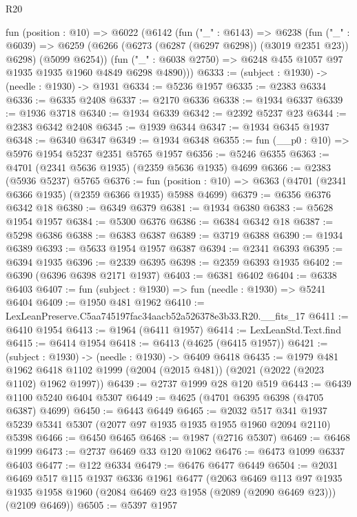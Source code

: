 \begin{lexlean}{R20}
\begin{coremodule}
  fun (position : @10) =>
  @6022
    (@6142
      (fun ("_" : @6143) =>
      @6238
        (fun ("_" : @6039) =>
        @6259 (@6266 (@6273 (@6287 (@6297 @6298)) (@3019 @2351 @23)) @6298) (@5099 @6254))
        (fun ("_" : @6038 @2750) => @6248 @455 @1057 @97 @1935 @1935 @1960 @4849 @6298 @4890)))
@6333 := (subject : @1930) -> (needle : @1930) -> @1931
@6334 := @5236 @1957
@6335 := @2383 @6334
@6336 := @6335 @2408
@6337 := @2170 @6336
@6338 := @1934 @6337
@6339 := @1936 @3718
@6340 := @1934 @6339
@6342 := @2392 @5237 @23
@6344 := @2383 @6342 @2408
@6345 := @1939 @6344
@6347 := @1934 @6345 @1937
@6348 := @6340 @6347
@6349 := @1934 @6348
@6355 := fun (__p0 : @10) => @5976 @1954 @5237 @2351 @5765 @1957
@6356 := @5246 @6355
@6363 := @4701 (@2341 @5636 @1935) (@2359 @5636 @1935) @4699
@6366 := @2383 (@5936 @5237) @5765
@6376 := fun (position : @10) => @6363 (@4701 (@2341 @6366 @1935) (@2359 @6366 @1935) @5988 @4699)
@6379 := @6356 @6376 @6342 @18
@6380 := @6349 @6379
@6381 := @1934 @6380
@6383 := @5628 @1954 @1957
@6384 := @5300 @6376
@6386 := @6384 @6342 @18
@6387 := @5298 @6386
@6388 := @6383 @6387
@6389 := @3719 @6388
@6390 := @1934 @6389
@6393 := @5633 @1954 @1957 @6387
@6394 := @2341 @6393
@6395 := @6394 @1935
@6396 := @2339 @6395
@6398 := @2359 @6393 @1935
@6402 := @6390 (@6396 @6398 @2171 @1937)
@6403 := @6381 @6402
@6404 := @6338 @6403
@6407 := fun (subject : @1930) => fun (needle : @1930) => @5241 @6404
@6409 := @1950 @481 @1962
@6410 := LexLeanPreserve.C5aa745197fac34aacb52a526378e3b33.R20.__fits_17
@6411 := @6410 @1954
@6413 := @1964 (@6411 @1957)
@6414 := LexLeanStd.Text.find
@6415 := @6414 @1954
@6418 := @6413 (@4625 (@6415 @1957))
@6421 := (subject : @1930) -> (needle : @1930) -> @6409 @6418
@6435 := @1979
    @481
    @1962
    @6418
    @1102
    @1999
    (@2004 (@2015 @481))
    (@2021 (@2022 (@2023 @1102) @1962 @1997))
@6439 := @2737 @1999 @28 @120 @519
@6443 := @6439 @1100 @5240 @6404 @5307
@6449 := @4625 (@4701 @6395 @6398 (@4705 @6387) @4699)
@6450 := @6443 @6449
@6465 := @2032
    @517
    @341
    @1937
    @5239
    @5341
    @5307
    (@2077 @97 @1935 @1935 @1955 @1960 @2094 @2110)
    @5398
@6466 := @6450 @6465
@6468 := @1987 (@2716 @5307)
@6469 := @6468 @1999
@6473 := @2737 @6469 @33 @120 @1062
@6476 := @6473 @1099 @6337 @6403
@6477 := @122 @6334
@6479 := @6476 @6477 @6449
@6504 := @2031
    @6469
    @517
    @115
    @1937
    @6336
    @1961
    @6477
    (@2063
      @6469
      @113
      @97
      @1935
      @1935
      @1958
      @1960
      (@2084 @6469 @23 @1958 (@2089 (@2090 @6469 @23)))
      (@2109 @6469))
@6505 := @5397 @1957

\end{coremodule}
\end{lexlean}

